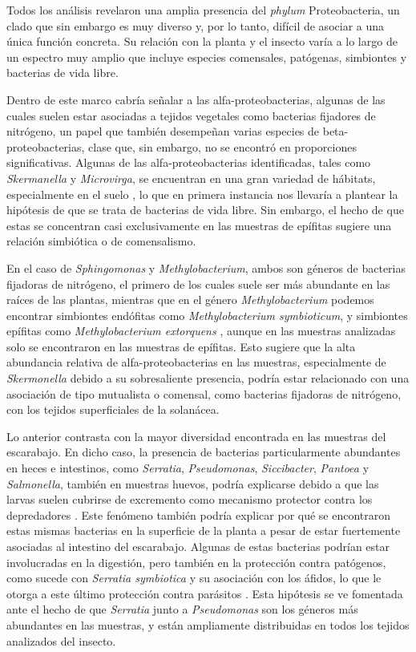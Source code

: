 \documentclass[
]{book}
\begin{document}
Todos los análisis revelaron una amplia presencia del \emph{phylum} Proteobacteria, un clado que sin embargo es muy diverso y, por lo tanto, difícil de asociar a una única función concreta. Su relación con la planta y el insecto varía a lo largo de un espectro muy amplio que incluye especies comensales, patógenas, simbiontes y bacterias de vida libre.

Dentro de este marco cabría señalar a las alfa-proteobacterias, algunas de las cuales suelen estar asociadas a tejidos vegetales como bacterias fijadores de nitrógeno, un papel que también desempeñan varias especies de beta-proteobacterias, clase que, sin embargo, no se encontró en proporciones significativas. Algunas de las alfa-proteobacterias identificadas, tales como \emph{Skermanella} y \emph{Microvirga}, se encuentran en una gran variedad de hábitats, especialmente en el suelo \citep{del2019soil}, lo que en primera instancia nos llevaría a plantear la hipótesis de que se trata de bacterias de vida libre. Sin embargo, el hecho de que estas se concentran casi exclusivamente en las muestras de epífitas sugiere una relación simbiótica o de comensalismo.

En el caso de \emph{Sphingomonas} y \emph{Methylobacterium}, ambos son géneros de bacterias fijadoras de nitrógeno, el primero de los cuales suele ser más abundante en las raíces de las plantas, mientras que en el género \emph{Methylobacterium} podemos encontrar simbiontes endófitas como \emph{Methylobacterium symbioticum}, y simbiontes epífitas como \emph{Methylobacterium extorquens} \citep{fausto2018olive}, aunque en las muestras analizadas solo se encontraron en las muestras de epífitas. Esto sugiere que la alta abundancia relativa de alfa-proteobacterias en las muestras, especialmente de \emph{Skermonella} debido a su sobresaliente presencia, podría estar relacionado con una asociación de tipo mutualista o comensal, como bacterias fijadoras de nitrógeno, con los tejidos superficiales de la solanácea.

Lo anterior contrasta con la mayor diversidad encontrada en las muestras del escarabajo. En dicho caso, la presencia de bacterias particularmente abundantes en heces e intestinos, como \emph{Serratia}, \emph{Pseudomonas}, \emph{Siccibacter}, \emph{Pantoea} y \emph{Salmonella}, también en muestras huevos, podría explicarse debido a que las larvas suelen cubrirse de excremento como mecanismo protector contra los depredadores \citep{visakorpi2021does}. Este fenómeno también podría explicar por qué se encontraron estas mismas bacterias en la superficie de la planta a pesar de estar fuertemente asociadas al intestino del escarabajo. Algunas de estas bacterias podrían estar involucradas en la digestión, pero también en la protección contra patógenos, como sucede con \emph{Serratia symbiotica} y su asociación con los áfidos, lo que le otorga a este último protección contra parásitos \citep{renoz2019evidence}. Esta hipótesis se ve fomentada ante el hecho de que \emph{Serratia} junto a \emph{Pseudomonas} son los géneros más abundantes en las muestras, y están ampliamente distribuidas en todos los tejidos analizados del insecto.
\end{document}
